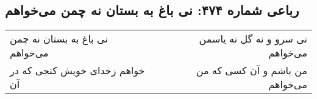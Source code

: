 \begin{center}
\section*{رباعی شماره ۴۷۴: نی باغ به بستان نه چمن می‌خواهم}
\label{sec:sh474}
\begin{longtable}{l p{0.5cm} r}
نی باغ به بستان نه چمن می‌خواهم
&&
نی سرو و نه گل نه یاسمن می‌خواهم
\\
خواهم زخدای خویش کنجی که در آن
&&
من باشم و آن کسی که من می‌خواهم
\\
\end{longtable}
\end{center}
